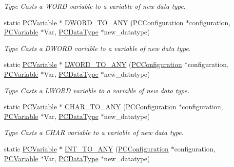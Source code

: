 \begin{DoxyCompactItemize}
\begin{DoxyCompactList}\small\item\em Type Casts a W\+O\+RD variable to a variable of new data type. \end{DoxyCompactList}\item 
static \hyperlink{classpc__emulator_1_1PCVariable}{P\+C\+Variable} $\ast$ \hyperlink{classpc__emulator_1_1Utils_a835281c18ed2920a93e7302fb5ad457c}{D\+W\+O\+R\+D\+\_\+\+T\+O\+\_\+\+A\+NY} (\hyperlink{classpc__emulator_1_1PCConfiguration}{P\+C\+Configuration} $\ast$configuration, \hyperlink{classpc__emulator_1_1PCVariable}{P\+C\+Variable} $\ast$Var, \hyperlink{classpc__emulator_1_1PCDataType}{P\+C\+Data\+Type} $\ast$new\+\_\+datatype)
\begin{DoxyCompactList}\small\item\em Type Casts a D\+W\+O\+RD variable to a variable of new data type. \end{DoxyCompactList}\item 
static \hyperlink{classpc__emulator_1_1PCVariable}{P\+C\+Variable} $\ast$ \hyperlink{classpc__emulator_1_1Utils_a47d91088a292574f0293847644af41b0}{L\+W\+O\+R\+D\+\_\+\+T\+O\+\_\+\+A\+NY} (\hyperlink{classpc__emulator_1_1PCConfiguration}{P\+C\+Configuration} $\ast$configuration, \hyperlink{classpc__emulator_1_1PCVariable}{P\+C\+Variable} $\ast$Var, \hyperlink{classpc__emulator_1_1PCDataType}{P\+C\+Data\+Type} $\ast$new\+\_\+datatype)
\begin{DoxyCompactList}\small\item\em Type Casts a L\+W\+O\+RD variable to a variable of new data type. \end{DoxyCompactList}\item 
static \hyperlink{classpc__emulator_1_1PCVariable}{P\+C\+Variable} $\ast$ \hyperlink{classpc__emulator_1_1Utils_afc81a5b33fafaa8bf4a9b80ca15770b5}{C\+H\+A\+R\+\_\+\+T\+O\+\_\+\+A\+NY} (\hyperlink{classpc__emulator_1_1PCConfiguration}{P\+C\+Configuration} $\ast$configuration, \hyperlink{classpc__emulator_1_1PCVariable}{P\+C\+Variable} $\ast$Var, \hyperlink{classpc__emulator_1_1PCDataType}{P\+C\+Data\+Type} $\ast$new\+\_\+datatype)
\begin{DoxyCompactList}\small\item\em Type Casts a C\+H\+AR variable to a variable of new data type. \end{DoxyCompactList}\item 
static \hyperlink{classpc__emulator_1_1PCVariable}{P\+C\+Variable} $\ast$ \hyperlink{classpc__emulator_1_1Utils_a431a9c5ceca0fe90cdd87a2a05479784}{I\+N\+T\+\_\+\+T\+O\+\_\+\+A\+NY} (\hyperlink{classpc__emulator_1_1PCConfiguration}{P\+C\+Configuration} $\ast$configuration, \hyperlink{classpc__emulator_1_1PCVariable}{P\+C\+Variable} $\ast$Var, \hyperlink{classpc__emulator_1_1PCDataType}{P\+C\+Data\+Type} $\ast$new\+\_\+datatype)

\end{DoxyCompactItemize}
